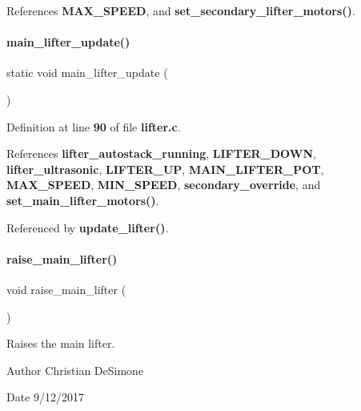 References \textbf{ M\+A\+X\+\_\+\+S\+P\+E\+ED}, and \textbf{ set\+\_\+secondary\+\_\+lifter\+\_\+motors()}.

\mbox{\label{lifter_8c_adfb6207ee1f20953058c8de81ec3386a}} 
\paragraph{main\+\_\+lifter\+\_\+update()}
{\footnotesize\ttfamily static void main\+\_\+lifter\+\_\+update (\begin{DoxyParamCaption}{ }\end{DoxyParamCaption})\hspace{0.3cm}{\ttfamily [static]}}



Definition at line \textbf{ 90} of file \textbf{ lifter.\+c}.



References \textbf{ lifter\+\_\+autostack\+\_\+running}, \textbf{ L\+I\+F\+T\+E\+R\+\_\+\+D\+O\+WN}, \textbf{ lifter\+\_\+ultrasonic}, \textbf{ L\+I\+F\+T\+E\+R\+\_\+\+UP}, \textbf{ M\+A\+I\+N\+\_\+\+L\+I\+F\+T\+E\+R\+\_\+\+P\+OT}, \textbf{ M\+A\+X\+\_\+\+S\+P\+E\+ED}, \textbf{ M\+I\+N\+\_\+\+S\+P\+E\+ED}, \textbf{ secondary\+\_\+override}, and \textbf{ set\+\_\+main\+\_\+lifter\+\_\+motors()}.



Referenced by \textbf{ update\+\_\+lifter()}.

\mbox{\label{lifter_8c_a2e2bd38b5b8b52378f3510368bf8aa0a}} 
\paragraph{raise\+\_\+main\+\_\+lifter()}
{\footnotesize\ttfamily void raise\+\_\+main\+\_\+lifter (\begin{DoxyParamCaption}{ }\end{DoxyParamCaption})}



Raises the main lifter. 

\begin{DoxyAuthor}{Author}
Christian De\+Simone 
\end{DoxyAuthor}
\begin{DoxyDate}{Date}
9/12/2017 
\end{DoxyDate}


